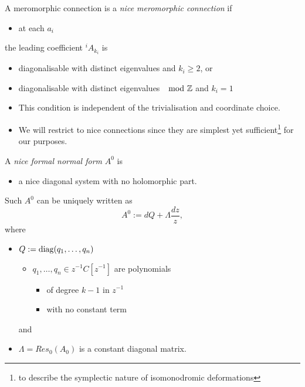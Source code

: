\begin{paracol}{2}\sloppy
\switchcolumn[0]\noindent
\begin{defn}
  A meromorphic connection is a \emph{nice meromorphic connection} if
  \begin{itemize}
    \item at each $a_i$
  \end{itemize}
  the leading coefficient ${}^iA_{k_i}$ is
  \begin{itemize}
    \item diagonalisable with distinct eigenvalues and $k_i\geq2$, or
    \item diagonalisable with distinct eigenvalues $\mod{\mathbb{Z}}$ and $k_i=1$
  \end{itemize}
  \begin{rem}
    \begin{itemize}
      \item This condition is independent of the trivialisation and coordinate
        choice.
      \item We will restrict to nice connections since they are simplest yet
        sufficient\footnote{to describe the symplectic nature of isomonodromic
        deformations} for our purposes.
    \end{itemize}
  \end{rem}
\end{defn}
\switchcolumn[1]\noindent
  \begin{defn}
    A \emph{nice formal normal form} $A^0$ is
    \begin{itemize}
      \item a nice diagonal system with no holomorphic part.
    \end{itemize}
    \begin{rem}
      Such $A^0$ can be uniquely written as
      \[
        A^0:= dQ + \Lambda \frac{dz}{z},
      \]
      where
      \begin{itemize}
        \item $Q := \operatorname{diag}(q_1,\dots ,q_n)$
          \begin{itemize}
            \item $q_1,\dots ,q_n\in z^{-1}C[z^{-1}]$ are polynomials
              \begin{itemize}
                \item of degree $k-1$ in $z^{-1}$
                \item with no constant term
              \end{itemize}
          \end{itemize}
          and
        \item $\Lambda = Res_0(A_0)$ is a constant diagonal matrix.
      \end{itemize}
    \end{rem}
  \end{defn}
\end{paracol}
